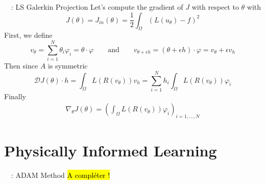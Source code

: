 \begin{frame}{\appendixname~~: LS Galerkin Projection}
	Let's compute the gradient of $J$ with respect to $\theta$ with
	\begin{equation*}
		J(\theta)=J_{in}(\theta)=\frac{1}{2}\int_\Omega (L(u_\theta) - f)^2
	\end{equation*}
	First, we define
	\begin{equation*}
		v_\theta=\sum_{i=1}^{N} \theta_i \varphi_i=\theta\cdot\varphi \qquad \text{and} \qquad v_{\theta+\epsilon h}=(\theta+\epsilon h)\cdot\varphi=v_\theta+\epsilon v_h
	\end{equation*}
	Then since $A$ is symmetric
	\begin{equation*}
		\mathcal{D}J(\theta)\cdot h = \int_\Omega L(R(v_\theta))v_h = \sum_{i=1}^N h_i\int_\Omega L(R(v_\theta))\varphi_i
	\end{equation*}
	Finally
	\begin{align*}
		\nabla_\theta J(\theta) = \left(\int_\Omega L(R(v_\theta))\varphi_i\right)_{i=1,\dots,N}
	\end{align*}
\end{frame}
\addtocounter{appendixframenumber}{1}

\section{Physically Informed Learning}

\begin{frame}{\appendixname~\theappendixframenumber~: ADAM Method}
	\hl{A compléter !}
\end{frame}
\addtocounter{appendixframenumber}{1}